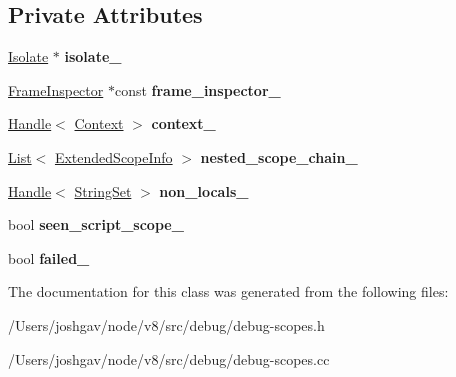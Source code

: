 \subsection*{Private Attributes}
\begin{DoxyCompactItemize}
\item 
\hyperlink{classv8_1_1internal_1_1_isolate}{Isolate} $\ast$ {\bfseries isolate\+\_\+}\hypertarget{classv8_1_1internal_1_1_scope_iterator_a9606ebd0f68b8dccca5940d43482605a}{}\label{classv8_1_1internal_1_1_scope_iterator_a9606ebd0f68b8dccca5940d43482605a}

\item 
\hyperlink{classv8_1_1internal_1_1_frame_inspector}{Frame\+Inspector} $\ast$const {\bfseries frame\+\_\+inspector\+\_\+}\hypertarget{classv8_1_1internal_1_1_scope_iterator_a18225292ddebbac7617d9ee6ba4934c8}{}\label{classv8_1_1internal_1_1_scope_iterator_a18225292ddebbac7617d9ee6ba4934c8}

\item 
\hyperlink{classv8_1_1internal_1_1_handle}{Handle}$<$ \hyperlink{classv8_1_1internal_1_1_context}{Context} $>$ {\bfseries context\+\_\+}\hypertarget{classv8_1_1internal_1_1_scope_iterator_a928c9338f065d8983093f9d7dcaf8392}{}\label{classv8_1_1internal_1_1_scope_iterator_a928c9338f065d8983093f9d7dcaf8392}

\item 
\hyperlink{classv8_1_1internal_1_1_list}{List}$<$ \hyperlink{structv8_1_1internal_1_1_scope_iterator_1_1_extended_scope_info}{Extended\+Scope\+Info} $>$ {\bfseries nested\+\_\+scope\+\_\+chain\+\_\+}\hypertarget{classv8_1_1internal_1_1_scope_iterator_a1a960b13ae5cdca0f6f566102275ba61}{}\label{classv8_1_1internal_1_1_scope_iterator_a1a960b13ae5cdca0f6f566102275ba61}

\item 
\hyperlink{classv8_1_1internal_1_1_handle}{Handle}$<$ \hyperlink{classv8_1_1internal_1_1_string_set}{String\+Set} $>$ {\bfseries non\+\_\+locals\+\_\+}\hypertarget{classv8_1_1internal_1_1_scope_iterator_a05ae85123b7d86d0d0329534955fff7c}{}\label{classv8_1_1internal_1_1_scope_iterator_a05ae85123b7d86d0d0329534955fff7c}

\item 
bool {\bfseries seen\+\_\+script\+\_\+scope\+\_\+}\hypertarget{classv8_1_1internal_1_1_scope_iterator_a36db68b5d56bde364a7d6993f8cd408c}{}\label{classv8_1_1internal_1_1_scope_iterator_a36db68b5d56bde364a7d6993f8cd408c}

\item 
bool {\bfseries failed\+\_\+}\hypertarget{classv8_1_1internal_1_1_scope_iterator_a6007e95270008c35a23db100e60585e6}{}\label{classv8_1_1internal_1_1_scope_iterator_a6007e95270008c35a23db100e60585e6}

\end{DoxyCompactItemize}


The documentation for this class was generated from the following files\+:\begin{DoxyCompactItemize}
\item 
/\+Users/joshgav/node/v8/src/debug/debug-\/scopes.\+h\item 
/\+Users/joshgav/node/v8/src/debug/debug-\/scopes.\+cc\end{DoxyCompactItemize}
